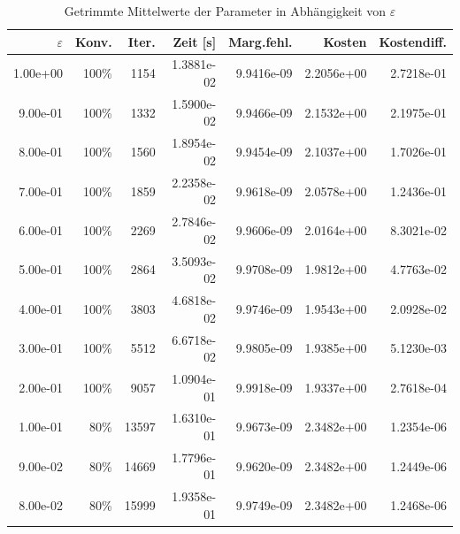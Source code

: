 \begin{table}[htbp]
\caption{Getrimmte Mittelwerte der Parameter in Abhängigkeit von $\varepsilon$}
\label{tab:Parametertest64_tol1e-08}
\small
\centering
{}
\begin{tabular}{rrrrrrr}
\toprule
$\varepsilon$ & Konv. & Iter. & Zeit [s] & Marg.fehl. & Kosten & Kostendiff. \\
\midrule
1.00e+00 & 100\% & 1154 & 1.3881e-02 & 9.9416e-09 & 2.2056e+00 & 2.7218e-01 \\
9.00e-01 & 100\% & 1332 & 1.5900e-02 & 9.9466e-09 & 2.1532e+00 & 2.1975e-01 \\
8.00e-01 & 100\% & 1560 & 1.8954e-02 & 9.9454e-09 & 2.1037e+00 & 1.7026e-01 \\
7.00e-01 & 100\% & 1859 & 2.2358e-02 & 9.9618e-09 & 2.0578e+00 & 1.2436e-01 \\
6.00e-01 & 100\% & 2269 & 2.7846e-02 & 9.9606e-09 & 2.0164e+00 & 8.3021e-02 \\
5.00e-01 & 100\% & 2864 & 3.5093e-02 & 9.9708e-09 & 1.9812e+00 & 4.7763e-02 \\
4.00e-01 & 100\% & 3803 & 4.6818e-02 & 9.9746e-09 & 1.9543e+00 & 2.0928e-02 \\
3.00e-01 & 100\% & 5512 & 6.6718e-02 & 9.9805e-09 & 1.9385e+00 & 5.1230e-03 \\
2.00e-01 & 100\% & 9057 & 1.0904e-01 & 9.9918e-09 & 1.9337e+00 & 2.7618e-04 \\
1.00e-01 & 80\% & 13597 & 1.6310e-01 & 9.9673e-09 & 2.3482e+00 & 1.2354e-06 \\
9.00e-02 & 80\% & 14669 & 1.7796e-01 & 9.9620e-09 & 2.3482e+00 & 1.2449e-06 \\
8.00e-02 & 80\% & 15999 & 1.9358e-01 & 9.9749e-09 & 2.3482e+00 & 1.2468e-06 \\
\bottomrule
\end{tabular}
\end{table}
